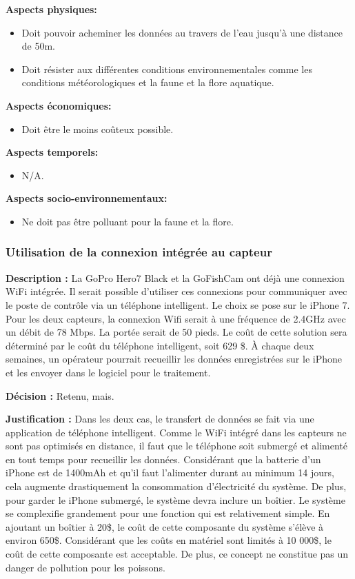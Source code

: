  \textbf{Aspects physiques:}
 \begin{itemize} [label = {--}]
    \item Doit pouvoir acheminer les données au travers de l'eau jusqu'à une distance de 50m.
    \item Doit résister aux différentes conditions environnementales comme les conditions météorologiques et la faune et la flore aquatique.
\end{itemize}

 \textbf{Aspects économiques:}
 \begin{itemize} [label = {--}]
    \item Doit être le moins coûteux possible.
\end{itemize}

 \textbf{Aspects temporels:}
 \begin{itemize} [label = {--}]
    \item N/A.
\end{itemize}

 \textbf{Aspects socio-environnementaux:}
 \begin{itemize} [label = {--}]
    \item Ne doit pas être polluant pour la faune et la flore.
\end{itemize}

\subsubsection{Utilisation de la connexion intégrée au capteur}
\textbf{Description :} La GoPro Hero7 Black et la GoFishCam ont déjà une connexion WiFi intégrée. Il serait possible d'utiliser ces connexions pour communiquer avec le poste de contrôle via un téléphone intelligent. Le choix se pose sur le iPhone 7. Pour les deux capteurs, la connexion Wifi serait à une fréquence de 2.4GHz avec un débit de 78 Mbps. La portée serait de 50 pieds. Le coût de cette solution sera déterminé par le coût du téléphone intelligent, soit 629 \$. À chaque deux semaines, un opérateur pourrait recueillir les données enregistrées sur le iPhone et les envoyer dans le logiciel pour le traitement.

\textbf{Décision :} Retenu, mais.
 
\textbf{Justification :} Dans les deux cas, le transfert de données se fait via une application de téléphone intelligent. Comme le WiFi intégré dans les capteurs ne sont pas optimisés en distance, il faut que le téléphone soit submergé et alimenté en tout temps pour recueillir les données. Considérant que la batterie d'un iPhone est de 1400mAh et qu'il faut l'alimenter durant au minimum 14 jours, cela augmente drastiquement la consommation d'électricité du système. De plus, pour garder le iPhone submergé, le système devra inclure un boîtier. Le système se complexifie grandement pour une fonction qui est relativement simple. En ajoutant un boîtier à 20\$, le coût de cette composante du système s'élève à environ 650\$. Considérant que les coûts en matériel sont limités à 10 000\$, le coût de cette composante est acceptable. De plus, ce concept ne constitue pas un danger de pollution pour les poissons.

